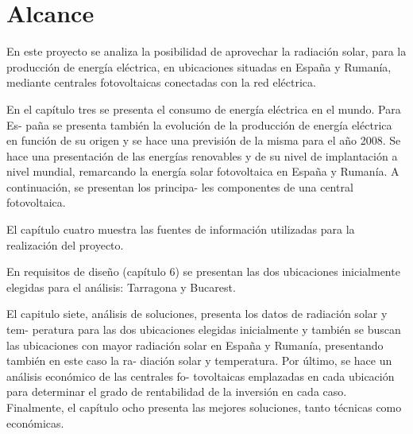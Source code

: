 \chapter{Alcance}

En este proyecto se analiza la posibilidad de aprovechar la radiación solar, para la producción de energía eléctrica, en ubicaciones situadas en España y Rumanía, mediante centrales fotovoltaicas conectadas con la red eléctrica.

En el capítulo tres se presenta el consumo de energía eléctrica en el mundo. Para Es- paña se presenta también la evolución de la producción de energía eléctrica en función de su origen y se hace una previsión de la misma para el año 2008. Se hace una presentación de las energías renovables y de su nivel de implantación a nivel mundial, remarcando la energía solar fotovoltaica en España y Rumanía. A continuación, se presentan los principa- les componentes de una central fotovoltaica.

El capítulo cuatro muestra las fuentes de información utilizadas para la realización del proyecto.

En requisitos de diseño (capítulo 6) se presentan las dos ubicaciones inicialmente elegidas para el análisis: Tarragona y Bucarest.

El capitulo siete, análisis de soluciones, presenta los datos de radiación solar y tem- peratura para las dos ubicaciones elegidas inicialmente y también se buscan las ubicaciones con mayor radiación solar en España y Rumanía, presentando también en este caso la ra- diación solar y temperatura. Por último, se hace un análisis económico de las centrales fo- tovoltaicas emplazadas en cada ubicación para determinar el grado de rentabilidad de la inversión en cada caso. Finalmente, el capítulo ocho presenta las mejores soluciones, tanto técnicas como económicas.
